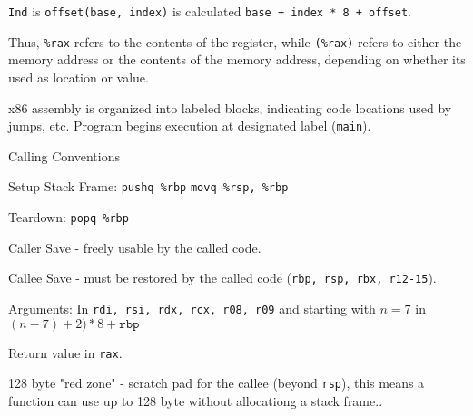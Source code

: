 \texttt{Ind} is  \texttt{offset(base, index)} is calculated \texttt{base + index * 8 + offset}.\medskip

Thus, \texttt{\%rax} refers to the contents of the register, while \texttt{(\%rax)} refers to either the memory address or the contents of the memory address, depending on whether its used as location or value.\medskip
	
x86 assembly is organized into labeled blocks, indicating code locations used by jumps, etc. Program begins execution at designated label (\texttt{main}).\medskip
	
Calling Conventions
\begin{compactitem}
	\item Setup Stack Frame: \texttt{pushq \%rbp} \quad \texttt{movq \%rsp, \%rbp}
	
	\item Teardown: \texttt{popq \%rbp}
		
	\item Caller Save - freely usable by the called code.
	
	\item Callee Save - must be restored by the called code (\texttt{rbp, rsp, rbx, r12-15}).
		
	\item Arguments: In \texttt{rdi, rsi, rdx, rcx, r08, r09} and starting with $n = 7$ in $(n-7) + 2) * 8 + \texttt{rbp}$
		
	\item Return value in \texttt{rax}.

	\item 128 byte "red zone" - scratch pad for the callee (beyond \texttt{rsp}), this means a function can use up to 128 byte without allocationg a stack frame..
\end{compactitem}

